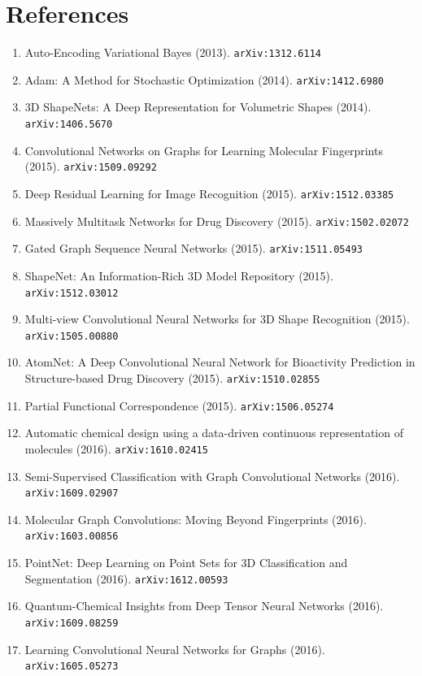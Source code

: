 \documentclass[11pt]{article}
\begin{document}
\section*{References}
\begin{enumerate}\small
  \item Auto-Encoding Variational Bayes (2013). \texttt{arXiv:1312.6114}
  \item Adam: A Method for Stochastic Optimization (2014). \texttt{arXiv:1412.6980}
  \item 3D ShapeNets: A Deep Representation for Volumetric Shapes (2014). \texttt{arXiv:1406.5670}
  \item Convolutional Networks on Graphs for Learning Molecular Fingerprints (2015). \texttt{arXiv:1509.09292}
  \item Deep Residual Learning for Image Recognition (2015). \texttt{arXiv:1512.03385}
  \item Massively Multitask Networks for Drug Discovery (2015). \texttt{arXiv:1502.02072}
  \item Gated Graph Sequence Neural Networks (2015). \texttt{arXiv:1511.05493}
  \item ShapeNet: An Information-Rich 3D Model Repository (2015). \texttt{arXiv:1512.03012}
  \item Multi-view Convolutional Neural Networks for 3D Shape Recognition (2015). \texttt{arXiv:1505.00880}
  \item AtomNet: A Deep Convolutional Neural Network for Bioactivity Prediction
  in Structure-based Drug Discovery (2015). \texttt{arXiv:1510.02855}
  \item Partial Functional Correspondence (2015). \texttt{arXiv:1506.05274}
  \item Automatic chemical design using a data-driven continuous representation
  of molecules (2016). \texttt{arXiv:1610.02415}
  \item Semi-Supervised Classification with Graph Convolutional Networks (2016). \texttt{arXiv:1609.02907}
  \item Molecular Graph Convolutions: Moving Beyond Fingerprints (2016). \texttt{arXiv:1603.00856}
  \item PointNet: Deep Learning on Point Sets for 3D Classification and
  Segmentation (2016). \texttt{arXiv:1612.00593}
  \item Quantum-Chemical Insights from Deep Tensor Neural Networks (2016). \texttt{arXiv:1609.08259}
  \item Learning Convolutional Neural Networks for Graphs (2016). \texttt{arXiv:1605.05273}

\end{enumerate}
\end{document}
